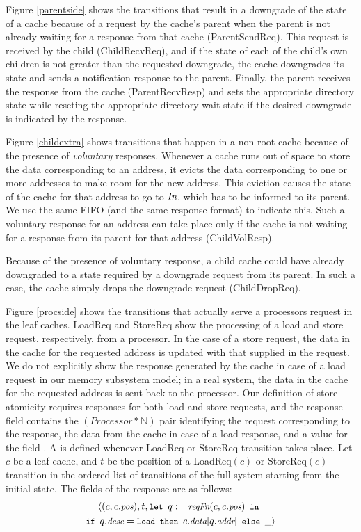 Figure \ref{parentside} shows the transitions that result in a downgrade of the
state of a cache because of a request by the cache's parent when the parent is
not already waiting for a response from that cache (ParentSendReq).  This
request is received by the child (ChildRecvReq), and if the state of each of
the child's own children is not greater than the requested downgrade, the cache
downgrades its state and sends a notification response to the parent. Finally,
the parent receives the response from the cache (ParentRecvResp) and sets the
appropriate directory state while reseting the appropriate directory wait state
if the desired downgrade is indicated by the response.

Figure \ref{childextra} shows transitions that happen in a non-root cache
because of the presence of \emph{voluntary} responses. Whenever a cache runs
out of space to store the data corresponding to an address, it evicts the data
corresponding to one or more addresses to make room for the new address. This
eviction causes the state of the cache for that address to go to $\textit{In}$, which
has to be informed to its parent. We use the same \cpResp{} FIFO (and the same
response format) to indicate this. Such a voluntary response for an address can
take place only if the cache is not waiting for a response from its parent for
that address (ChildVolResp).

Because of the presence of voluntary response, a child cache could have already
downgraded to a state required by a downgrade request from its parent. In such
a case, the cache simply drops the downgrade request (ChildDropReq).

Figure \ref{procside} shows the transitions that actually serve a processors
request in the leaf caches. LoadReq and StoreReq show the processing of a load
and store request, respectively, from a processor. In the case of a store
request, the data in the cache for the requested address is updated with that
supplied in the request. We do not explicitly show the response generated by
the cache in case of a load request in our memory subsystem model; in a real
system, the data in the cache for the requested address is sent back to the
processor. Our definition of store atomicity requires responses for both load
and store requests, and the response field contains the
$(\textit{Processor}*\mathbb{N})$ pair identifying the request corresponding to
the response, the data from the cache in case of a load response, and a value
for the field \tme. A \Response{} is defined whenever LoadReq or StoreReq
transition takes place. Let $c$ be a leaf cache, and $t$ be the position of a
LoadReq$(c)$ or StoreReq$(c)$ transition in the ordered list of transitions of
the full system starting from the initial state. The fields of the response are
as follows:
\begin{multline*}
\small\langle (c, c.\pos), t, \mylet q := \reqFn(c, c.\pos) \myin\\
\small\myif q.\desc = \Ld \mythen c.\data[q.\addr] \myelse \_ \rangle
\end{multline*}


